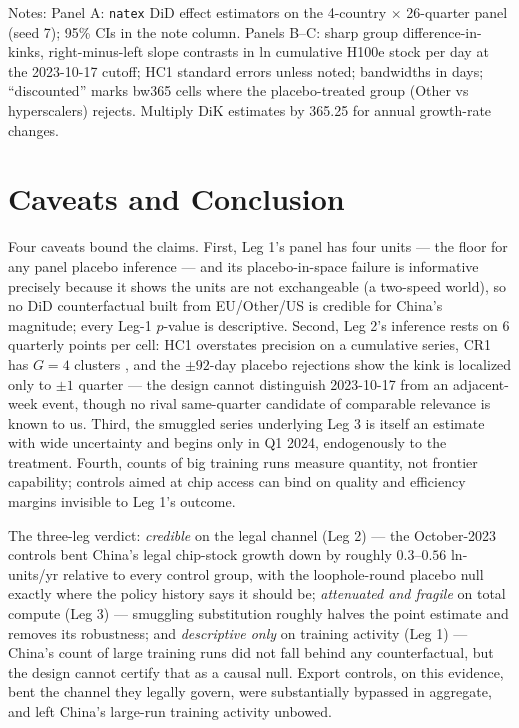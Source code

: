 \documentclass[11pt]{article}
\newcommand{\natex}{\texttt{natex}}
\begin{document}
\begin{table}[t]
\medskip
\parbox{0.94\textwidth}{\footnotesize Notes: Panel A: \natex{} DiD effect
estimators on the 4-country $\times$ 26-quarter panel (seed 7); 95\% CIs in
the note column. Panels B--C: sharp group difference-in-kinks,
right-minus-left slope contrasts in ln cumulative H100e stock per day at the
2023-10-17 cutoff; HC1 standard errors unless noted; bandwidths in days;
``discounted'' marks bw365 cells where the placebo-treated group (Other vs
hyperscalers) rejects. Multiply DiK estimates by 365.25 for annual
growth-rate changes.}
\end{table}

\section{Caveats and Conclusion}\label{sec:conclusion}

Four caveats bound the claims. First, Leg 1's panel has four units --- the
floor for any panel placebo inference --- and its placebo-in-space failure is
informative precisely because it shows the units are not exchangeable (a
two-speed world), so no DiD counterfactual built from EU/Other/US is credible
for China's magnitude; every Leg-1 $p$-value is descriptive. Second, Leg 2's
inference rests on 6 quarterly points per cell: HC1 overstates precision on
a cumulative series, CR1 has $G=4$ clusters \cite{cameron2015}, and the
$\pm 92$-day placebo rejections show the kink is localized only to $\pm 1$
quarter --- the design cannot distinguish 2023-10-17 from an adjacent-week
event, though no rival same-quarter candidate of comparable relevance is
known to us. Third, the smuggled series underlying Leg 3 is itself an
estimate with wide uncertainty \cite{juniewicz2026} and begins only in Q1
2024, endogenously to the treatment. Fourth, counts of big training runs
measure quantity, not frontier capability; controls aimed at chip access can
bind on quality and efficiency margins invisible to Leg 1's outcome.

The three-leg verdict: \emph{credible} on the legal channel (Leg 2) --- the
October-2023 controls bent China's legal chip-stock growth down by roughly
$0.3$--$0.56$ ln-units/yr relative to every control group, with the
loophole-round placebo null exactly where the policy history says it should
be; \emph{attenuated and fragile} on total compute (Leg 3) --- smuggling
substitution roughly halves the point estimate and removes its robustness;
and \emph{descriptive only} on training activity (Leg 1) --- China's count
of large training runs did not fall behind any counterfactual, but the
design cannot certify that as a causal null. Export controls, on this
evidence, bent the channel they legally govern, were substantially bypassed
in aggregate, and left China's large-run training activity unbowed.
\end{document}
